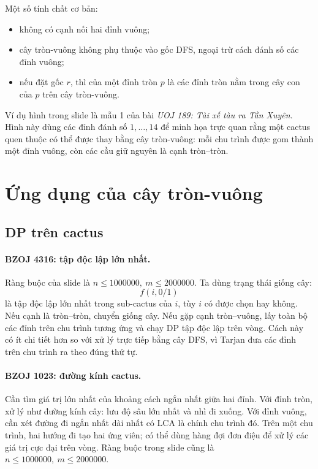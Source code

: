 \documentclass[11pt]{article}
\begin{document}
Một số tính chất cơ bản:
\begin{itemize}
  \item không có cạnh nối hai đỉnh vuông;
  \item cây tròn-vuông không phụ thuộc vào gốc DFS, ngoại trừ cách đánh số
        các đỉnh vuông;
  \item nếu đặt gốc \(r\), thì  của một đỉnh tròn \(p\) là
        các đỉnh tròn nằm trong cây con của \(p\) trên cây tròn-vuông.
\end{itemize}

Ví dụ hình trong slide là mẫu 1 của bài \emph{UOJ 189: Tài xế tàu ra Tần
Xuyên}. Hình này dùng các đỉnh đánh số \(1,\ldots,14\) để minh họa trực quan
rằng một cactus quen thuộc có thể được thay bằng cây tròn-vuông: mỗi chu trình
được gom thành một đỉnh vuông, còn các cầu giữ nguyên là cạnh tròn--tròn.

\section{Ứng dụng của cây tròn-vuông}

\subsection{DP trên cactus}

\paragraph{BZOJ 4316: tập độc lập lớn nhất.}
Ràng buộc của slide là \(n\le 1000000,\ m\le 2000000\).
Ta dùng trạng thái giống cây:
\[
  f(i,0/1)
\]
là tập độc lập lớn nhất trong sub-cactus của \(i\), tùy \(i\) có được chọn hay
không. Nếu cạnh là tròn--tròn, chuyển giống cây. Nếu gặp cạnh tròn--vuông,
lấy toàn bộ các đỉnh trên chu trình tương ứng và chạy DP tập độc lập trên
vòng. Cách này có ít chi tiết hơn so với xử lý trực tiếp bằng cây DFS, vì
Tarjan đưa các đỉnh trên chu trình ra theo đúng thứ tự.

\paragraph{BZOJ 1023: đường kính cactus.}
Cần tìm giá trị lớn nhất của khoảng cách ngắn nhất giữa hai đỉnh. Với đỉnh
tròn, xử lý như đường kính cây: lưu độ sâu lớn nhất và nhì đi xuống. Với đỉnh
vuông, cần xét đường đi ngắn nhất dài nhất có LCA là chính chu trình đó. Trên
một chu trình, hai hướng đi tạo hai ứng viên; có thể dùng hàng đợi đơn điệu để
xử lý các giá trị cực đại trên vòng. Ràng buộc trong slide cũng là
\(n\le 1000000,\ m\le 2000000\).
\end{document}
